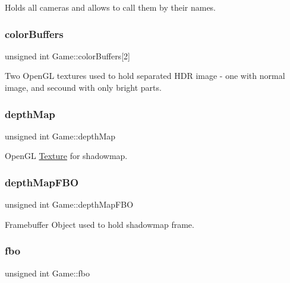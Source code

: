 Holds all cameras and allows to call them by their names. 

\mbox{\label{class_game_af6b4374237efc5ae2586dd1b2a0304f3}} 
\subsubsection{\texorpdfstring{colorBuffers}{colorBuffers}}
{\footnotesize\ttfamily unsigned int Game\+::color\+Buffers\mbox{[}2\mbox{]}\hspace{0.3cm}{\ttfamily [protected]}}



Two Open\+GL textures used to hold separated H\+DR image -\/ one with normal image, and secound with only bright parts. 

\mbox{\label{class_game_a61853261d678bcfe2638deba1e58fd18}} 
\subsubsection{\texorpdfstring{depthMap}{depthMap}}
{\footnotesize\ttfamily unsigned int Game\+::depth\+Map\hspace{0.3cm}{\ttfamily [protected]}}



Open\+GL \mbox{\hyperlink{class_texture}{Texture}} for shadowmap. 

\mbox{\label{class_game_aab4586c4a7c0240977381b22808ebfa6}} 
\subsubsection{\texorpdfstring{depthMapFBO}{depthMapFBO}}
{\footnotesize\ttfamily unsigned int Game\+::depth\+Map\+F\+BO\hspace{0.3cm}{\ttfamily [protected]}}



Framebuffer Object used to hold shadowmap frame. 

\mbox{\label{class_game_a64cdbfe0d81d60426bb6523459d7b52c}} 
\subsubsection{\texorpdfstring{fbo}{fbo}}
{\footnotesize\ttfamily unsigned int Game\+::fbo\hspace{0.3cm}{\ttfamily [protected]}}



